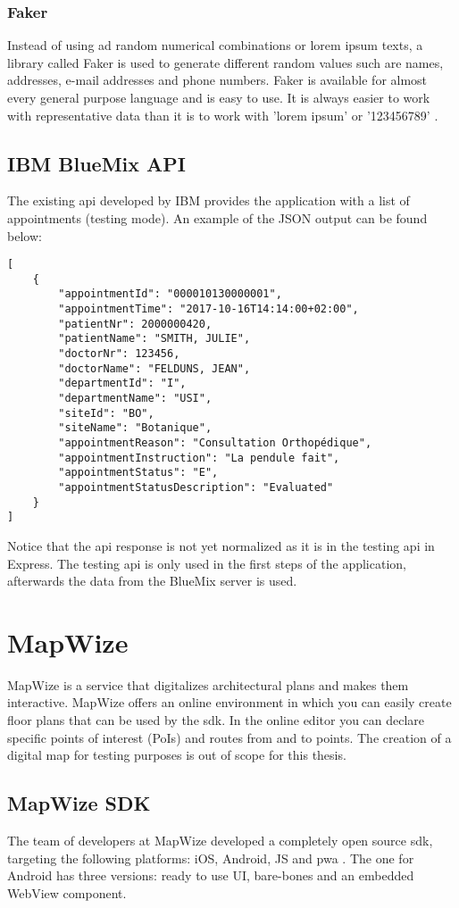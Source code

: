\subsubsection{Faker}
Instead of using ad random numerical combinations or lorem ipsum texts, a library called Faker is used to generate different random values such are names, addresses, e-mail addresses and phone numbers. Faker is available for almost every general purpose language and is easy to use. It is always easier to work with representative data than it is to work with 'lorem ipsum' or '123456789' \cite{DanieleFaraglia2014}.
\subsection{IBM BlueMix API}
The existing \acrshort{api} developed by IBM provides the application with a list of appointments (testing mode). An example of the JSON output can be found below:

\begin{verbatim}
[
    {
        "appointmentId": "000010130000001",
        "appointmentTime": "2017-10-16T14:14:00+02:00",
        "patientNr": 2000000420,
        "patientName": "SMITH, JULIE",
        "doctorNr": 123456,
        "doctorName": "FELDUNS, JEAN",
        "departmentId": "I",
        "departmentName": "USI",
        "siteId": "BO",
        "siteName": "Botanique",
        "appointmentReason": "Consultation Orthopédique",
        "appointmentInstruction": "La pendule fait",
        "appointmentStatus": "E",
        "appointmentStatusDescription": "Evaluated"
    }
]
\end{verbatim}
Notice that the \acrshort{api} response is not yet normalized as it is in the testing \acrshort{api} in Express. The testing \acrshort{api} is only used in the first steps of the application, afterwards the data from the BlueMix server is used.
\section{MapWize}
MapWize is a service that digitalizes architectural plans and makes them interactive. MapWize offers an online environment in which you can easily create floor plans that can be used by the \acrshort{sdk}. In the online editor you can declare specific points of interest (PoIs) and routes from and to points. The creation of a digital map for testing purposes is out of scope for this thesis.
\subsection{MapWize SDK}
The team of developers at MapWize developed a completely open source \acrshort{sdk}, targeting the following platforms: iOS, Android, JS and \acrfull{pwa} \cite{MapWize.io2019a}. The one for Android has three versions: ready to use UI, bare-bones and an embedded WebView component.
